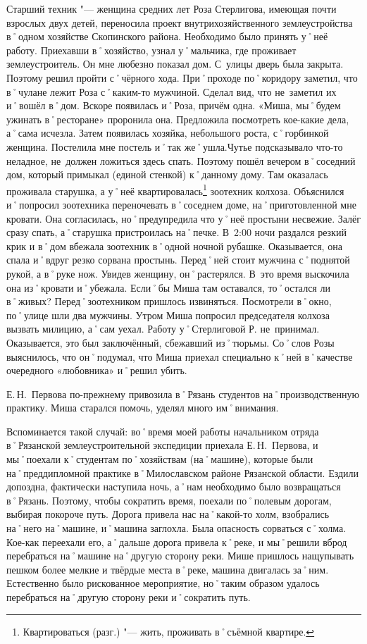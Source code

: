 Старший техник "--- женщина средних лет Роза Стерлигова, имеющая почти взрослых двух детей, переносила проект внутрихозяйственного землеустройства в˚одном хозяйстве Скопинского района. Необходимо было принять у˚неё работу. Приехавши в˚хозяйство, узнал у˚мальчика, где проживает землеустроитель. Он мне любезно показал дом. С~улицы дверь была закрыта. Поэтому решил пройти с˚чёрного хода. При˚проходе по˚коридору заметил, что в˚чулане лежит Роза с˚каким-то мужчиной. Сделал вид, что не~заметил их и˚вошёл в˚дом. Вскоре появилась и˚Роза, причём одна. «Миша, мы˚будем ужинать в˚ресторане» проронила она. Предложила посмотреть кое-какие дела, а˚сама исчезла. Затем появилась хозяйка, небольшого роста, с˚горбинкой женщина. Постелила мне постель и˚так же˚ушла.Чутье подсказывало что-то неладное, не~должен ложиться здесь спать. Поэтому пошёл вечером в˚соседний дом, который примыкал (единой стенкой) к˚данному дому. Там оказалась проживала старушка, а у˚неё квартировалась\footnote{Квартироваться (разг.) "--- жить, проживать в˚съёмной квартире.} зоотехник колхоза. Объяснился и˚попросил зоотехника переночевать в˚соседнем доме, на˚приготовленной мне кровати. Она согласилась, но˚предупредила что у˚неё простыни несвежие. Залёг сразу спать, а˚старушка пристроилась на˚печке. В~2:00 ночи раздался резкий крик и в˚дом вбежала зоотехник в˚одной ночной рубашке. Оказывается, она спала и˚вдруг резко сорвана простынь. Перед˚ней стоит мужчина с˚поднятой рукой, а в˚руке нож. Увидев женщину, он˚растерялся. В~это время выскочила она из˚кровати и˚убежала. Если˚бы Миша там оставался, то˚остался ли в˚живых? Перед˚зоотехником пришлось извиняться. Посмотрели в˚окно, по˚улице шли два мужчины. Утром Миша попросил председателя колхоза вызвать милицию, а˚сам уехал. Работу у˚Стерлиговой Р. не~принимал. Оказывается, это был заключённый, сбежавший из˚тюрьмы. Со˚слов Розы выяснилось, что он˚подумал, что Миша приехал специально к˚ней в˚качестве очередного «любовника» и˚решил убить.

Е.\,Н.~Первова по-прежнему привозила в˚Рязань студентов на˚производственную практику. Миша старался помочь, уделял много им˚внимания.

Вспоминается такой случай: во˚время моей работы начальником отряда в˚Рязанской землеустроительной экспедиции приехала Е.\,Н.~Первова, и мы˚поехали к˚студентам по˚хозяйствам (на˚машине), которые были на˚преддипломной практике в˚Милославском районе Рязанской области. Ездили допоздна, фактически наступила ночь, а˚нам необходимо было возвращаться в˚Рязань. Поэтому, чтобы сократить время, поехали по˚полевым дорогам, выбирая покороче путь. Дорога привела нас на˚какой-то холм, взобрались на˚него на˚машине, и˚машина заглохла. Была опасность сорваться с˚холма. Кое-как переехали его, а˚дальше дорога привела к˚реке, и мы˚решили вброд перебраться на˚машине на˚другую сторону реки. Мише пришлось нащупывать пешком более мелкие и твёрдые места в˚реке, машина двигалась за˚ним. Естественно было рискованное мероприятие, но˚таким образом удалось перебраться на˚другую сторону реки и˚сократить путь. 

